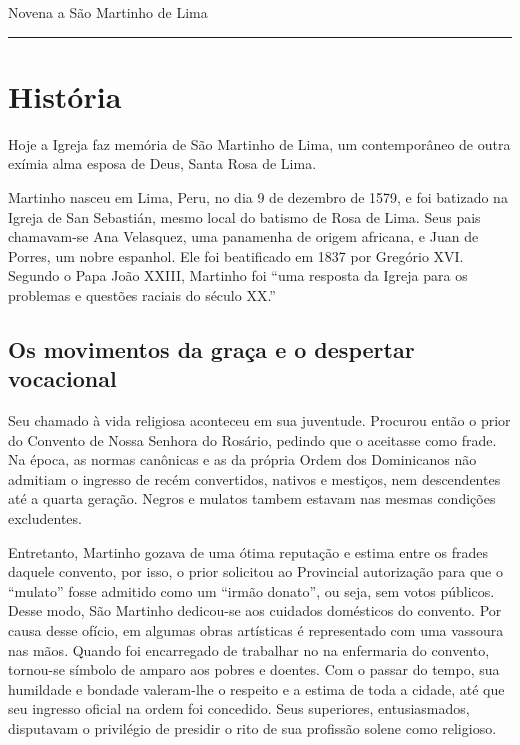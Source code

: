 \documentclass[a4paper,14pt]{extarticle} \usepackage[utf8]{inputenc}
\begin{document}
\begin{center}
  {\huge Novena a São Martinho de Lima}
\end{center}


\par\noindent\rule{\textwidth}{0.4pt}

\tableofcontents
\thispagestyle{empty}

\newpage

\section{História}

Hoje a Igreja faz memória de São Martinho de Lima, um contemporâneo de outra exímia alma esposa de Deus, Santa Rosa de Lima.

Martinho nasceu em Lima, Peru, no dia 9 de dezembro de 1579, e foi batizado na Igreja de San Sebastián, mesmo local do batismo de Rosa de Lima. Seus pais chamavam-se Ana Velasquez, uma panamenha de origem africana, e Juan de Porres, um nobre espanhol. Ele foi beatificado em 1837 por Gregório XVI. Segundo o Papa João XXIII, Martinho foi “uma resposta da Igreja para os problemas e questões raciais do século XX.”

\subsection{Os movimentos da graça e o despertar vocacional}

Seu chamado à vida religiosa aconteceu em sua juventude. Procurou então o prior do Convento de Nossa Senhora do Rosário, pedindo que o aceitasse como frade. Na época, as normas canônicas e as da própria Ordem dos Dominicanos não admitiam o ingresso de recém convertidos, nativos e mestiços, nem descendentes até a quarta geração. Negros e mulatos tambem estavam nas mesmas condições excludentes.

Entretanto, Martinho gozava de uma ótima reputação e estima entre os frades daquele convento, por isso, o prior solicitou ao Provincial autorização para que o “mulato” fosse admitido como um “irmão donato”, ou seja, sem votos públicos. Desse modo, São Martinho dedicou-se aos cuidados domésticos do convento. Por causa desse ofício, em algumas obras artísticas é representado com uma vassoura nas mãos. Quando foi encarregado de trabalhar no na enfermaria do convento, tornou-se símbolo de amparo aos pobres e doentes. Com o passar do tempo, sua humildade e bondade valeram-lhe o respeito e a estima de toda a cidade, até que seu ingresso oficial na ordem foi concedido. Seus superiores, entusiasmados, disputavam o privilégio de presidir o rito de sua profissão solene como religioso.
\end{document}
